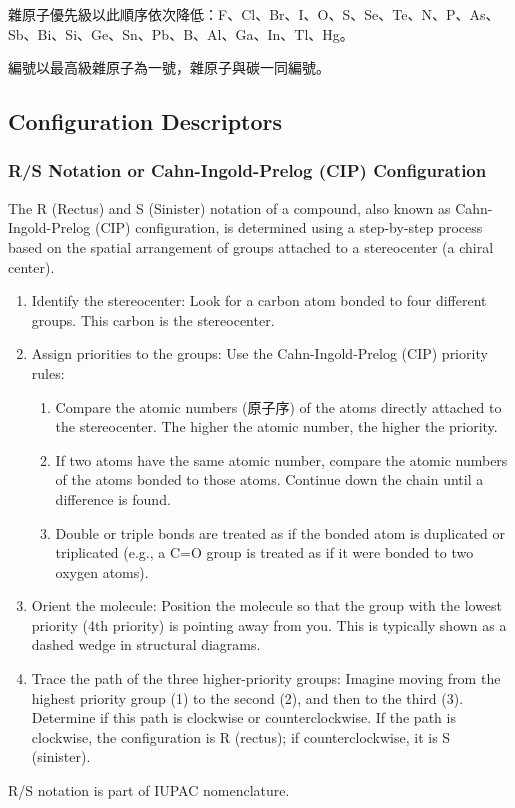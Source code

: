 \documentclass[a4paper,12pt]{report}
\begin{document}
雜原子優先級以此順序依次降低：F、Cl、Br、I、O、S、Se、Te、N、P、As、Sb、Bi、Si、Ge、Sn、Pb、B、Al、Ga、In、Tl、Hg。

編號以最高級雜原子為一號，雜原子與碳一同編號。
\subsection{Configuration Descriptors}
\subsubsection{R/S Notation or Cahn-Ingold-Prelog (CIP) Configuration}
The R (Rectus) and S (Sinister) notation of a compound, also known as Cahn-Ingold-Prelog (CIP) configuration, is determined using a step-by-step process based on the spatial arrangement of groups attached to a stereocenter (a chiral center). 
\begin{enumerate}
\item Identify the stereocenter: Look for a carbon atom bonded to four different groups. This carbon is the stereocenter.
\item Assign priorities to the groups: Use the Cahn-Ingold-Prelog (CIP) priority rules:
\begin{enumerate}[label=\roman*.]
\item Compare the atomic numbers (原子序) of the atoms directly attached to the stereocenter. The higher the atomic number, the higher the priority.
\item If two atoms have the same atomic number, compare the atomic numbers of the atoms bonded to those atoms. Continue down the chain until a difference is found.
\item Double or triple bonds are treated as if the bonded atom is duplicated or triplicated (e.g., a C=O group is treated as if it were bonded to two oxygen atoms).
\end{enumerate}
\item Orient the molecule: Position the molecule so that the group with the lowest priority (4th priority) is pointing away from you. This is typically shown as a dashed wedge in structural diagrams.
\item Trace the path of the three higher-priority groups: Imagine moving from the highest priority group (1) to the second (2), and then to the third (3). Determine if this path is clockwise or counterclockwise. If the path is clockwise, the configuration is R (rectus); if counterclockwise, it is S (sinister).
\end{enumerate}
R/S notation is part of IUPAC nomenclature.
\end{document}
